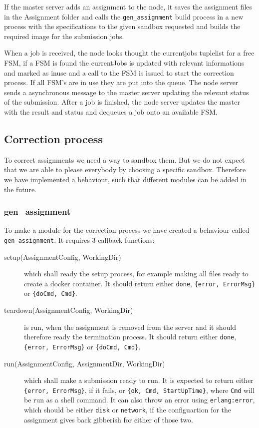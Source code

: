 If the master server adds an assignment to the node, it saves the assignment files in the Assignment folder and calls the \texttt{gen\_assignment} build process in a new process with the specifications to the given sandbox requested and builds the required image for the submission jobs.

When a job is received, the node looks thought the currentjobs tuplelist for a free FSM, if a FSM is found the currentJobs is updated with relevant informations and marked as inuse and a call to the FSM is issued to start the correction process. If all FSM's are in use they are put into the queue. The node server sends a asynchronous message to the master server updating the relevant status of the submission. After a job is finished, the node server updates the master with the result and status and dequeues a job onto an available FSM.

\subsection{Correction process}
To correct assignments we need a way to sandbox them. But we do not expect that
we are able to please everybody by choosing a specific sandbox. Therefore we
have implemented a behaviour, such that different modules can be added in the
future.

\subsubsection{gen\_assignment}
To make a module for the correction process we have created a behaviour called
\texttt{gen\_assignment}. It requires 3 callback functions:
\begin{description}
    \item[setup(AssignmentConfig, WorkingDir)] which shall ready the setup
    process, for example making all files ready to create a docker container.
    It should return either \texttt{done}, \texttt{\{error, ErrorMsg\}} or
    \texttt{\{doCmd, Cmd\}}.
    \item[teardown(AssignmentConfig, WorkingDir)] is run, when the assignment is
    removed from the server and it should therefore ready the termination
    process. It should return either \texttt{done}, \texttt{\{error, ErrorMsg\}}
    or \texttt{\{doCmd, Cmd\}}.
    \item[run(AssignmentConfig, AssignmentDir, WorkingDir)] which shall make a
    submission ready to run. It is expected to return either
    \texttt{\{error, ErrorMsg\}}, if it fails, or
    \texttt{\{ok, Cmd, StartUpTime\}}, where \texttt{Cmd} will be run as a shell
    command. It can also throw an error using \texttt{erlang:error}, which
    should be either \texttt{disk} or \texttt{network}, if the configuartion for the
    assignment gives back gibberish for either of those two.
\end{description}

